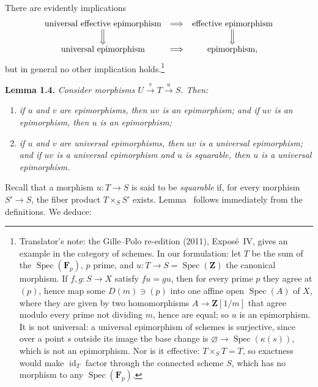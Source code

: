 There are evidently implications
\[
\begin{array}{ccc}
 \text{universal effective epimorphism}
   &\Longrightarrow& \text{effective epimorphism}\\
 \Big\Downarrow && \Big\Downarrow\\
 \text{universal epimorphism}
   &\Longrightarrow& \text{epimorphism},
\end{array}
\]
but in general no other implication holds.\footnote{Translator's note: the Gille--Polo re-edition (2011), Expos\'e~IV, gives an
example in the category of schemes. In our formulation: let \(T\) be the sum
of the \(\operatorname{Spec}(\mathbf F_p)\), \(p\) prime, and
\(u\colon T\to S=\operatorname{Spec}(\mathbf Z)\) the canonical morphism. If
\(f,g\colon S\to X\) satisfy \(fu=gu\), then for every prime \(p\) they agree
at \((p)\), hence map some \(D(m)\ni(p)\) into one affine open
\(\operatorname{Spec}(A)\) of \(X\), where they are given by two homomorphisms
\(A\to\mathbf Z[1/m]\) that agree modulo every prime not dividing \(m\), hence
are equal; so \(u\) is an epimorphism. It is not universal: a universal
epimorphism of schemes is surjective, since over a point \(s\) outside its
image the base change is \(\varnothing\to\operatorname{Spec}(\kappa(s))\),
which is not an epimorphism. Nor is it effective: \(T\times_ST=T\), so
exactness would make \(\operatorname{id}_T\) factor through the connected
scheme \(S\), which has no morphism to any
\(\operatorname{Spec}(\mathbf F_p)\).}

\medskip
\noindent{}\textbf{Lemma 1.4.}
\textit{Consider morphisms \(U\xrightarrow{v}T\xrightarrow{u}S\). Then:}
\begin{enumerate}
  \item[(a)] \textit{if \(u\) and \(v\) are epimorphisms, then \(uv\) is an
    epimorphism; and if \(uv\) is an epimorphism, then \(u\) is an
    epimorphism;}
  \item[(b)] \textit{if \(u\) and \(v\) are universal epimorphisms, then
    \(uv\) is a universal epimorphism; and if \(uv\) is a universal
    epimorphism and \(u\) is squarable, then \(u\) is a universal
    epimorphism.}
\end{enumerate}

Recall that a morphism \(u:T\to S\) is said to be \emph{squarable} if, for
every morphism \(S'\to S\), the fiber product \(T\times_S S'\) exists.
Lemma~ follows immediately from the definitions. We deduce:

